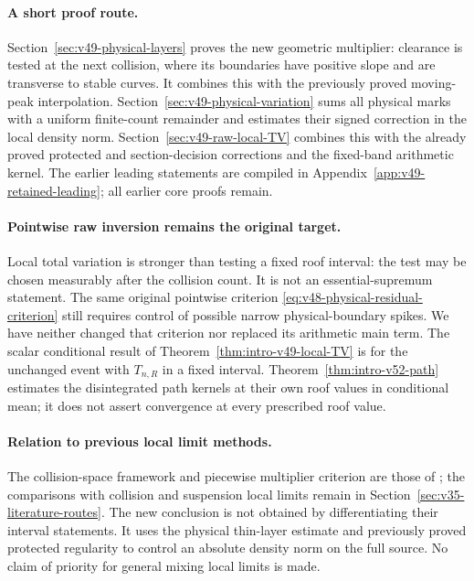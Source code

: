 \paragraph{A short proof route.}
Section~\ref{sec:v49-physical-layers} proves the new geometric
multiplier: clearance is tested at the next collision, where its
boundaries have positive slope and are transverse to stable curves.
It combines this with the previously proved moving-peak interpolation.
Section~\ref{sec:v49-physical-variation} sums all physical marks
with a uniform finite-count remainder and estimates their signed
correction in the local density norm.
Section~\ref{sec:v49-raw-local-TV} combines this with the already
proved protected and section-decision corrections and the fixed-band
arithmetic kernel. The earlier leading statements are compiled in
Appendix~\ref{app:v49-retained-leading}; all earlier core proofs remain.

\paragraph{Pointwise raw inversion remains the original target.}
Local total variation is stronger than testing a fixed roof interval:
the test may be chosen measurably after the collision count. It is not
an essential-supremum statement. The same original pointwise criterion
\eqref{eq:v48-physical-residual-criterion} still requires control of
possible narrow physical-boundary spikes. We have neither changed that
criterion nor replaced its arithmetic main term. The scalar conditional result of Theorem~\ref{thm:intro-v49-local-TV}
is for the unchanged event with $T_{n,R}$ in a fixed interval.
Theorem~\ref{thm:intro-v52-path} estimates the disintegrated path
kernels at their own roof values in conditional mean; it does not
assert convergence at every prescribed roof value.

\paragraph{Relation to previous local limit methods.}
The collision-space framework and piecewise multiplier criterion are
those of \cite{DZ11,DZ,DPZ}; the comparisons with collision and
suspension local limits remain in
Section~\ref{sec:v35-literature-routes}. The new conclusion is not
obtained by differentiating their interval statements. It uses the
physical thin-layer estimate and previously proved protected
regularity to control an absolute density norm on the full source.
No claim of priority for general mixing local limits is made.

